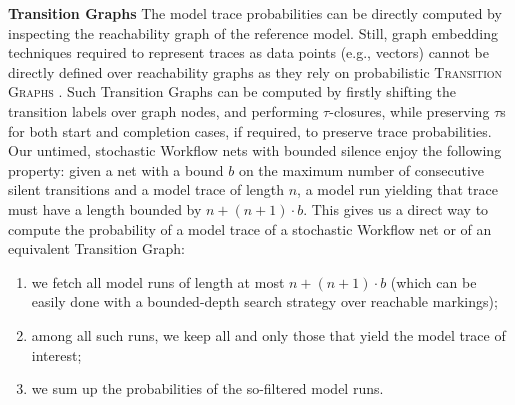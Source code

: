 \medskip
\noindent
\textbf{Transition Graphs} The model trace probabilities can be directly computed by inspecting the reachability graph of the reference model. Still, graph embedding techniques required to represent traces as data points (e.g., vectors)
cannot be directly defined over reachability graphs as they %
rely on probabilistic \textsc{Transition Graphs} \cite{GartnerFW03}. Such Transition Graphs can be computed by firstly shifting the transition labels over graph nodes, and performing $\tau$-closures, while preserving $\tau$s for both start and completion cases, if required, to preserve trace probabilities. %
Our untimed, stochastic Workflow nets with bounded silence enjoy the following property: given a net with a bound $b$ on the maximum number of consecutive silent transitions and a model trace of length $n$, a model run yielding that trace must have a length bounded by $n+(n+1)\cdot b$.
This gives us a direct way to compute the probability of a model trace of a stochastic Workflow net or of an equivalent Transition Graph:
\begin{enumerate}
	\item  we fetch all model runs of length at most $n+(n+1)\cdot b$ (which can be easily done with a bounded-depth search strategy over reachable markings);
	\item among all such runs, we keep all and only those that yield the model trace of interest;
	\item we sum up the probabilities of the so-filtered model runs.
\end{enumerate}



